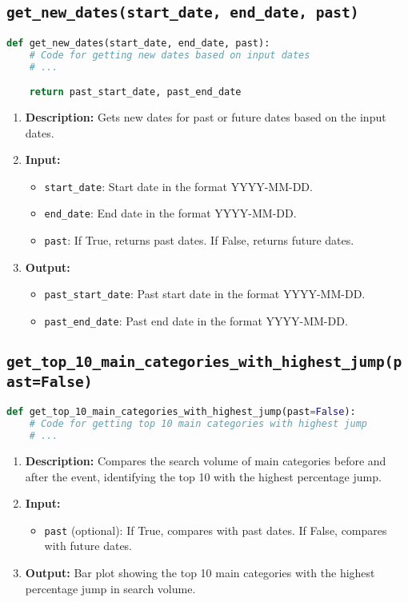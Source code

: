 \subsection{\texttt{get\_new\_dates(start\_date, end\_date, past)}}
\begin{lstlisting}[language=Python]
def get_new_dates(start_date, end_date, past):
    # Code for getting new dates based on input dates
    # ...

    return past_start_date, past_end_date
\end{lstlisting}
\begin{enumerate}
    \item \textbf{Description:} Gets new dates for past or future dates based on the input dates.
    \item \textbf{Input:}
          \begin{itemize}
              \item \texttt{start\_date}: Start date in the format YYYY-MM-DD.
              \item \texttt{end\_date}: End date in the format YYYY-MM-DD.
              \item \texttt{past}: If True, returns past dates. If False, returns future dates.
          \end{itemize}
    \item \textbf{Output:}
          \begin{itemize}
              \item \texttt{past\_start\_date}: Past start date in the format YYYY-MM-DD.
              \item \texttt{past\_end\_date}: Past end date in the format YYYY-MM-DD.
          \end{itemize}
\end{enumerate}


\subsection{\texttt{get\_top\_10\_main\_categories\_with\_highest\_jump(past=False)}}
\begin{lstlisting}[language=Python]
def get_top_10_main_categories_with_highest_jump(past=False):
    # Code for getting top 10 main categories with highest jump
    # ...

\end{lstlisting}
\begin{enumerate}
    \item \textbf{Description:} Compares the search volume of main categories before and after the event, identifying the top 10 with the highest percentage jump.
    \item \textbf{Input:}
          \begin{itemize}
              \item \texttt{past} (optional): If True, compares with past dates. If False, compares with future dates.
          \end{itemize}
    \item \textbf{Output:} Bar plot showing the top 10 main categories with the highest percentage jump in search volume.
\end{enumerate}

